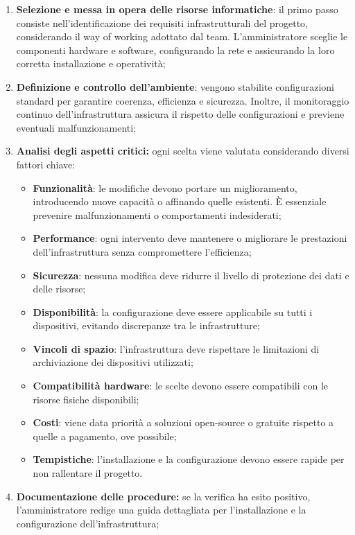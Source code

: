 \begin{enumerate}
    \item \textbf{Selezione e messa in opera delle risorse informatiche}: il primo passo consiste nell’identificazione dei requisiti infrastrutturali del progetto, considerando il way of working adottato dal team. L'amministratore sceglie le componenti hardware e software, configurando la rete e assicurando la loro corretta installazione e operatività;
    \item \textbf{Definizione e controllo dell’ambiente}: vengono stabilite configurazioni standard per garantire coerenza, efficienza e sicurezza. Inoltre, il monitoraggio continuo dell’infrastruttura assicura il rispetto delle configurazioni e previene eventuali malfunzionamenti;
    \item \textbf{Analisi degli aspetti critici:} ogni scelta viene valutata considerando diversi fattori chiave:
    \begin{itemize}
        \item \textbf{Funzionalità}: le modifiche devono portare un miglioramento, introducendo nuove capacità o affinando quelle esistenti. È essenziale prevenire malfunzionamenti o comportamenti indesiderati;
        \item \textbf{Performance}: ogni intervento deve mantenere o migliorare le prestazioni dell'infrastruttura senza compromettere l'efficienza;
        \item \textbf{Sicurezza}: nessuna modifica deve ridurre il livello di protezione dei dati e delle risorse;
        \item \textbf{Disponibilità}: la configurazione deve essere applicabile su tutti i dispositivi, evitando discrepanze tra le infrastrutture;
        \item \textbf{Vincoli di spazio}: l'infrastruttura deve rispettare le limitazioni di archiviazione dei dispositivi utilizzati;
        \item \textbf{Compatibilità hardware}: le scelte devono essere compatibili con le risorse fisiche disponibili;
        \item \textbf{Costi}: viene data priorità a soluzioni open-source o gratuite rispetto a quelle a pagamento, ove possibile;
        \item \textbf{Tempistiche}: l'installazione e la configurazione devono essere rapide per non rallentare il progetto.
    \end{itemize}
    \item \textbf{Documentazione delle procedure:} se la verifica ha esito positivo, l’amministratore redige una guida dettagliata per l'installazione e la configurazione dell’infrastruttura;

\end{enumerate}
